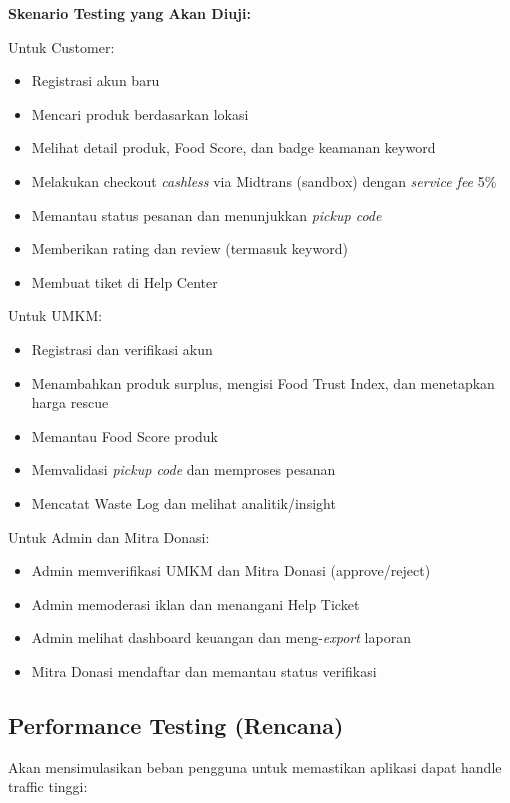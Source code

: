 \textbf{Skenario Testing yang Akan Diuji:}

Untuk Customer:
\begin{itemize}[leftmargin=*]
    \item Registrasi akun baru
    \item Mencari produk berdasarkan lokasi
    \item Melihat detail produk, Food Score, dan badge keamanan keyword
    \item Melakukan checkout \textit{cashless} via Midtrans (sandbox) dengan \textit{service fee} 5\%
    \item Memantau status pesanan dan menunjukkan \textit{pickup code}
    \item Memberikan rating dan review (termasuk keyword)
    \item Membuat tiket di Help Center
\end{itemize}

Untuk UMKM:
\begin{itemize}[leftmargin=*]
    \item Registrasi dan verifikasi akun
    \item Menambahkan produk surplus, mengisi Food Trust Index, dan menetapkan harga rescue
    \item Memantau Food Score produk
    \item Memvalidasi \textit{pickup code} dan memproses pesanan
    \item Mencatat Waste Log dan melihat analitik/insight
\end{itemize}

Untuk Admin dan Mitra Donasi:
\begin{itemize}[leftmargin=*]
    \item Admin memverifikasi UMKM dan Mitra Donasi (approve/reject)
    \item Admin memoderasi iklan dan menangani Help Ticket
    \item Admin melihat dashboard keuangan dan meng-\textit{export} laporan
    \item Mitra Donasi mendaftar dan memantau status verifikasi
\end{itemize}

\subsection{Performance Testing (Rencana)}

Akan mensimulasikan beban pengguna untuk memastikan aplikasi dapat handle traffic tinggi:


